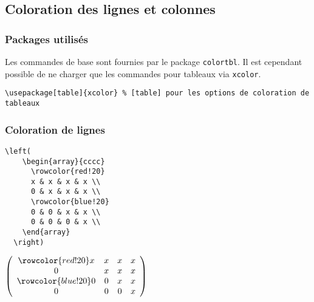 \subsection{Coloration des lignes et colonnes}
\subsubsection{Packages utilisés}
Les commandes de base sont fournies par le package \texttt{colortbl}. Il est cependant possible de ne charger que les commandes pour tableaux via \texttt{xcolor}.

\begin{lstlisting}[language={[LaTeX]TeX}]
  \usepackage[table]{xcolor} % [table] pour les options de coloration de tableaux
\end{lstlisting}

\subsubsection{Coloration de lignes}
\noindent
\begin{minipage}{.65\textwidth}
\begin{lstlisting}[language={[LaTeX]TeX}]
  \left(
    \begin{array}{cccc}
      \rowcolor{red!20}
      x & x & x & x \\
      0 & x & x & x \\
      \rowcolor{blue!20}
      0 & 0 & x & x \\
      0 & 0 & 0 & x \\
    \end{array}
  \right)
\end{lstlisting}
\end{minipage}%
\hfill%
$\displaystyle{
  \left(
    \begin{array}{cccc}
      \rowcolor{red!20}
      x  & x   & x & x \\
      0  & x   & x & x \\
      \rowcolor{blue!20}
      0   & 0  & x & x \\
      0   & 0  & 0 & x \\
    \end{array}
  \right)}$
\hfill\rule{0pt}{0pt}

